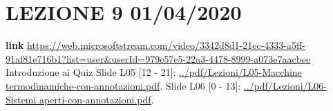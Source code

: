 \section*{LEZIONE 9 01/04/2020}
\textbf{link} \url{https://web.microsoftstream.com/video/3342d8d1-21ec-4333-a5ff-91af81e716b1?list=user&userId=979e57e5-22a3-4478-8999-a073e7aacbee}\newline
\newline
Introduzione ai Quiz \newline
\newline
Slide L05 [12 - 21]: \url{../pdf/Lezioni/L05-Macchine termodinamiche-con-annotazioni.pdf}.\newline
\newline
Slide L06 [0 - 13]: \url{../pdf/Lezioni/L06-Sistemi aperti-con-annotazioni.pdf}.\newline
\newline
